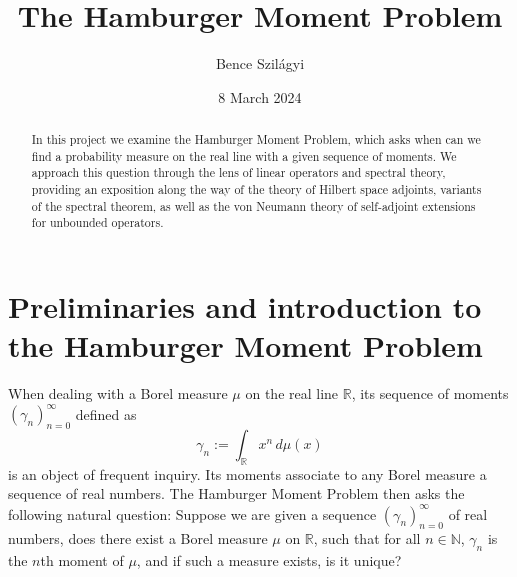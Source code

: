 \documentclass[12pt,oneside]{report}
\title{The Hamburger Moment Problem}
\date{8 March 2024}
\author{Bence Szilágyi}
\begin{document}
\newcommand{\Ran}{\mathrm{Ran}}
\newcommand{\supp}{\mathrm{supp}}
\newcommand{\spanrm}{\mathrm{span}}
\newcommand{\id}{\mathrm{id}}

\maketitle

\begin{abstract} In this project we examine the Hamburger Moment Problem, which asks when can we find a probability measure on the real line with a given sequence of moments. We approach this question through the lens of linear operators and spectral theory, providing an exposition along the way of the theory of Hilbert space adjoints, variants of the spectral theorem, as well as the von Neumann theory of self-adjoint extensions for unbounded operators. \end{abstract}
\declaration
\dedication{To my family, much love and thank you all for supporting me unconditionally.}

\tableofcontents
{}
\newpage
{}


\chapter{Preliminaries and introduction to the Hamburger Moment Problem}\label{ch1}

When dealing with a Borel measure $\mu$ on the real line $\mathbb{R}$, its sequence of moments $(\gamma_{n})_{n=0}^{\infty}$ defined as $$
\gamma_{n} := \int _{\mathbb{R}} x^{n} \, d\mu(x)
$$is an object of frequent inquiry. Its moments associate to any Borel measure a sequence of real numbers. The Hamburger Moment Problem then asks the following natural question: Suppose we are given a sequence $(\gamma_{n})_{n=0}^{\infty}$ of real numbers, does there exist a Borel measure $\mu$ on $\mathbb{R}$, such that for all $n \in \mathbb{N}$, $\gamma_{n}$ is the $n$th moment of $\mu$, and if such a measure exists, is it unique?
\end{document}
